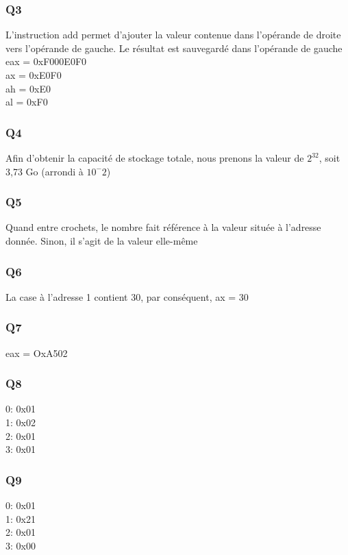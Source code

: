 \documentclass[12pt,a4paper,oneside]{article}
\begin{document}
\subsubsection{Q3}
L'instruction add permet d'ajouter la valeur contenue dans l'opérande de droite vers l'opérande de gauche. Le résultat est sauvegardé dans l'opérande de gauche\\
eax = 0xF000E0F0\\
ax = 0xE0F0\\
ah = 0xE0\\
al = 0xF0\\

\subsubsection{Q4}
Afin d'obtenir la capacité de stockage totale, nous prenons la valeur de $2^{32}$, soit 3,73 Go (arrondi à $10^-2$)

\subsubsection{Q5}
Quand entre crochets, le nombre fait référence à la valeur située à l'adresse donnée. Sinon, il s'agit de la valeur elle-même

\subsubsection{Q6}
La case à l'adresse 1 contient 30, par conséquent, ax = 30

\subsubsection{Q7}
eax = OxA502

\subsubsection{Q8}
0: 0x01\\
1: 0x02\\
2: 0x01\\
3: 0x01\\

\subsubsection{Q9}
0: 0x01\\
1: 0x21\\
2: 0x01\\
3: 0x00\\
\end{document}
